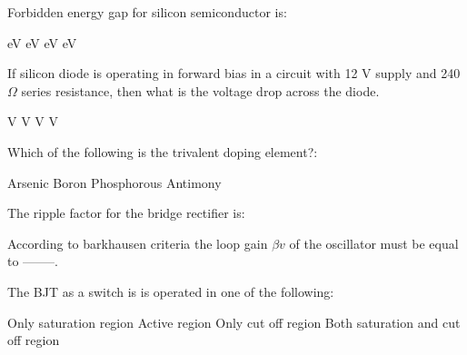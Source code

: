 \documentclass[a4, 12pt, addpoints]{exam}
\begin{document}
\begin{questions}
\question Forbidden energy gap for silicon semiconductor is:\\[0.3cm]
\begin{oneparchoices}
 eV
 eV
 eV
 eV
\end{oneparchoices} 
\question If silicon diode is operating in forward bias in a circuit with 12 V supply and 240 $\Omega$ series resistance, then what is the voltage drop across the diode. \\[0.3cm]
\begin{oneparchoices}
 V
 V
 V
 V
\end{oneparchoices}  
\question Which of the following is the trivalent doping element?:\\[0.3cm]
\begin{oneparchoices}
\choice Arsenic
\choice Boron
\choice Phosphorous
\choice Antimony
\end{oneparchoices}  
\question The ripple factor for the bridge rectifier is:\\[0.3cm]
\begin{oneparchoices}
\end{oneparchoices}  
\question According to barkhausen criteria the loop gain $\beta v$ of the oscillator must be equal to --------.\\[0.3cm]
\begin{oneparchoices}
\end{oneparchoices} 
\question The BJT as a switch is is operated in one of the following:
\begin{oneparchoices}
\choice Only saturation region
\choice Active region
\choice Only cut off region
\choice Both saturation and cut off region
\end{oneparchoices}  


\end{questions}
\end{document}
